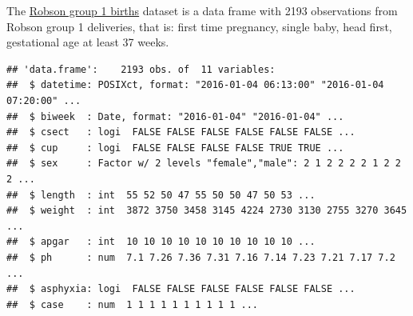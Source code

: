 \documentclass[
]{book}
\newenvironment{Shaded}{\begin{snugshade}}{\end{snugshade}}
\newcommand{\AttributeTok}[1]{\textcolor[rgb]{0.13,0.29,0.53}{#1}}
\newcommand{\CommentTok}[1]{\textcolor[rgb]{0.56,0.35,0.01}{\textit{#1}}}
\newcommand{\DecValTok}[1]{\textcolor[rgb]{0.00,0.00,0.81}{#1}}
\newcommand{\FunctionTok}[1]{\textcolor[rgb]{0.13,0.29,0.53}{\textbf{#1}}}
\newcommand{\NormalTok}[1]{#1}
\newcommand{\OtherTok}[1]{\textcolor[rgb]{0.56,0.35,0.01}{#1}}
\newcommand{\SpecialCharTok}[1]{\textcolor[rgb]{0.81,0.36,0.00}{\textbf{#1}}}
\newcommand{\StringTok}[1]{\textcolor[rgb]{0.31,0.60,0.02}{#1}}
\begin{document}
The \hyperref[robson-group-1-births]{Robson group 1 births} dataset is a data frame with 2193 observations from Robson group 1 deliveries, that is: first time pregnancy, single baby, head first, gestational age at least 37 weeks.

\begin{Shaded}
\end{Shaded}

\begin{verbatim}
## 'data.frame':    2193 obs. of  11 variables:
##  $ datetime: POSIXct, format: "2016-01-04 06:13:00" "2016-01-04 07:20:00" ...
##  $ biweek  : Date, format: "2016-01-04" "2016-01-04" ...
##  $ csect   : logi  FALSE FALSE FALSE FALSE FALSE FALSE ...
##  $ cup     : logi  FALSE FALSE FALSE FALSE TRUE TRUE ...
##  $ sex     : Factor w/ 2 levels "female","male": 2 1 2 2 2 2 1 2 2 2 ...
##  $ length  : int  55 52 50 47 55 50 50 47 50 53 ...
##  $ weight  : int  3872 3750 3458 3145 4224 2730 3130 2755 3270 3645 ...
##  $ apgar   : int  10 10 10 10 10 10 10 10 10 10 ...
##  $ ph      : num  7.1 7.26 7.36 7.31 7.16 7.14 7.23 7.21 7.17 7.2 ...
##  $ asphyxia: logi  FALSE FALSE FALSE FALSE FALSE FALSE ...
##  $ case    : num  1 1 1 1 1 1 1 1 1 1 ...
\end{verbatim}
\end{document}
